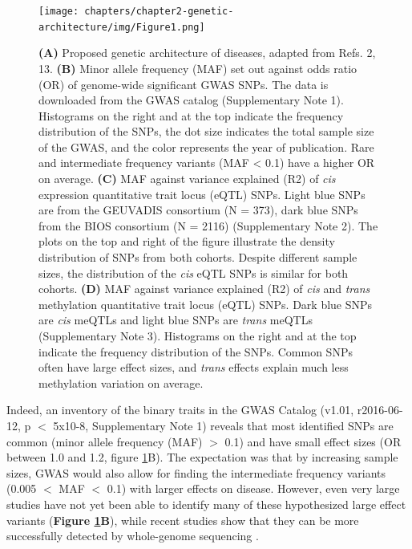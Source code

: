 \begin{figure}[H]
	\texttt{[image: chapters/chapter2-genetic-architecture/img/Figure1.png]}
	\caption{\footnotesize \textbf{(A)} Proposed genetic architecture of diseases, adapted from Refs. 2, 13. \textbf{(B)} Minor allele frequency (MAF) set out against odds ratio (OR) of genome-wide significant GWAS SNPs. The data is downloaded from the GWAS catalog (Supplementary Note 1). Histograms on the right and at the top indicate the frequency distribution of the SNPs, the dot size indicates the total sample size of the GWAS, and the color represents the year of publication. Rare and intermediate frequency variants (MAF < 0.1) have a higher OR on average. \textbf{(C)} MAF against variance explained (R2) of \textit{cis} expression quantitative trait locus (eQTL) SNPs. Light blue SNPs are from the GEUVADIS consortium (N = 373), dark blue SNPs from the BIOS consortium (N = 2116) (Supplementary Note 2). The plots on the top and right of the figure illustrate the density distribution of SNPs from both cohorts. Despite different sample sizes, the distribution of the \textit{cis} eQTL SNPs is similar for both cohorts. \textbf{(D)} MAF against variance explained (R2) of \textit{cis} and \textit{trans} methylation quantitative trait locus (eQTL) SNPs. Dark blue SNPs are \textit{cis} meQTLs and light blue SNPs are \textit{trans} meQTLs (Supplementary Note 3). Histograms on the right and at the top indicate the frequency distribution of the SNPs. Common SNPs often have large effect sizes, and \textit{trans} effects explain much less methylation variation on average.}
	\label{architecture_fig1}
\end{figure}

Indeed, an inventory of the binary traits in the GWAS Catalog (v1.01, r2016-06-12, p $<$ 5x10-8, Supplementary Note 1) reveals that most identified SNPs are common (minor allele frequency (MAF) $>$ 0.1) and have small effect sizes (OR between 1.0 and 1.2, figure \ref{architecture_fig1}B). The expectation was that by increasing sample sizes, GWAS would also allow for finding the intermediate frequency variants (0.005 $<$ MAF $<$ 0.1) with larger effects on disease. However, even very large studies have not yet been able to identify many of these hypothesized large effect variants \cite{fuchsbergerGeneticArchitectureType2016} (\textbf{Figure \ref{architecture_fig1}B}), while recent studies show that they can be more successfully detected by whole-genome sequencing \cite{del-aguilaAlzheimerDiseaseRare2015,walterUK10KProjectIdentifies2015}.

